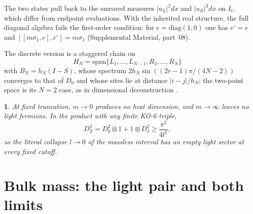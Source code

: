 \documentclass[aps,prd,reprint,onecolumn,nofootinbib,amsmath,amssymb,floatfix]{revtex4-2}
\theoremstyle{plain}
\newcommand{\resultname}{}
\newtheorem*{resultenv}{\resultname}
\newenvironment{result}[1]{\renewcommand{\resultname}{#1}\begin{resultenv}}{\end{resultenv}}
\newcommand{\supp}[1]{Supplemental Material, part~#1}
\begin{document}
The two states pull back to the smeared measures $|u_L|^2dx$ and $|u_R|^2dx$ on $I_l$, which differ from endpoint evaluations. With the inherited real structure, the full diagonal algebra fails the first-order condition: for $e=\mathrm{diag}(1,0)$ one has $e^\circ=e$ and $[[m\sigma_1,e],e^\circ]=m\sigma_1$ (\supp{08}).

The discrete version is a staggered chain on
\begin{equation}
H_N=\mathrm{span}\{L_1,\dots,L_{N-1},R_2,\dots,R_N\}
\end{equation}
with $B_N=h_N(I-S)$, whose spectrum $2h_N\sin((2r-1)\pi/(4N-2))$ converges to that of $D_0$ and whose sites lie at distance $|i-j|/h_N$; the two-point space is its $N=2$ case, as in dimensional deconstruction \cite{AHCG2001}.

\begin{result}{Proposition A.1 (bare limits)}
At fixed truncation, $m\to0$ produces no heat dimension, and $m\to\infty$ leaves no light fermions. In the product with any finite KO-6 triple,
\begin{equation}
D_F^2=D_0^2\otimes1+1\otimes D_I^2\ge\frac{\pi^2}{4l^2},
\end{equation}
so the literal collapse $l\to0$ of the massless interval has an empty light sector at every fixed cutoff.
\end{result}

\section{Bulk mass: the light pair and both limits}
\end{document}
